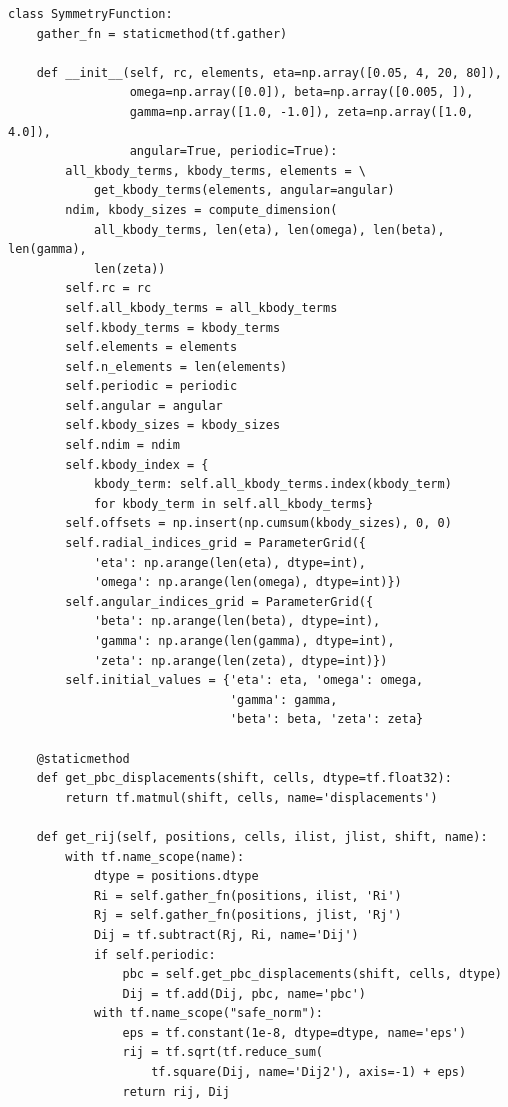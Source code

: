 \documentclass[final,1p,times]{elsarticle}
\begin{document}
\begin{verbatim}
class SymmetryFunction:
    gather_fn = staticmethod(tf.gather)

    def __init__(self, rc, elements, eta=np.array([0.05, 4, 20, 80]),
                 omega=np.array([0.0]), beta=np.array([0.005, ]),
                 gamma=np.array([1.0, -1.0]), zeta=np.array([1.0, 4.0]),
                 angular=True, periodic=True):
        all_kbody_terms, kbody_terms, elements = \
            get_kbody_terms(elements, angular=angular)
        ndim, kbody_sizes = compute_dimension(
            all_kbody_terms, len(eta), len(omega), len(beta), len(gamma),
            len(zeta))
        self.rc = rc
        self.all_kbody_terms = all_kbody_terms
        self.kbody_terms = kbody_terms
        self.elements = elements
        self.n_elements = len(elements)
        self.periodic = periodic
        self.angular = angular
        self.kbody_sizes = kbody_sizes
        self.ndim = ndim
        self.kbody_index = {
            kbody_term: self.all_kbody_terms.index(kbody_term)
            for kbody_term in self.all_kbody_terms}
        self.offsets = np.insert(np.cumsum(kbody_sizes), 0, 0)
        self.radial_indices_grid = ParameterGrid({
            'eta': np.arange(len(eta), dtype=int),
            'omega': np.arange(len(omega), dtype=int)})
        self.angular_indices_grid = ParameterGrid({
            'beta': np.arange(len(beta), dtype=int),
            'gamma': np.arange(len(gamma), dtype=int),
            'zeta': np.arange(len(zeta), dtype=int)})
        self.initial_values = {'eta': eta, 'omega': omega, 
                               'gamma': gamma,
                               'beta': beta, 'zeta': zeta}

    @staticmethod
    def get_pbc_displacements(shift, cells, dtype=tf.float32):
        return tf.matmul(shift, cells, name='displacements')

    def get_rij(self, positions, cells, ilist, jlist, shift, name):
        with tf.name_scope(name):
            dtype = positions.dtype
            Ri = self.gather_fn(positions, ilist, 'Ri')
            Rj = self.gather_fn(positions, jlist, 'Rj')
            Dij = tf.subtract(Rj, Ri, name='Dij')
            if self.periodic:
                pbc = self.get_pbc_displacements(shift, cells, dtype)
                Dij = tf.add(Dij, pbc, name='pbc')
            with tf.name_scope("safe_norm"):
                eps = tf.constant(1e-8, dtype=dtype, name='eps')
                rij = tf.sqrt(tf.reduce_sum(
                    tf.square(Dij, name='Dij2'), axis=-1) + eps)
                return rij, Dij


\end{verbatim}
\end{document}
